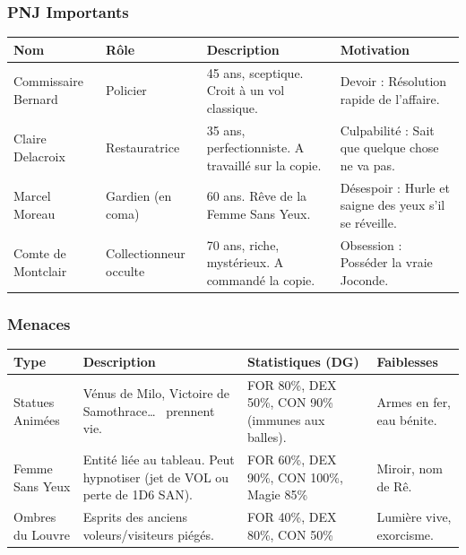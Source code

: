 \documentclass[10pt,a5paper,twoside]{book}
\begin{document}
\newpage

\subsubsection*{PNJ Importants}
\begin{center}
	\begin{tabular}{|P{2cm}|P{3cm}|P{3.5cm}|P{2.5cm}|}
	\hline
	\textbf{Nom} 		& \textbf{Rôle} 			& \textbf{Description}									& \textbf{Motivation} \\ \hline
	Commissaire Bernard & Policier 					& 45 ans, sceptique. Croit à un vol classique. 			& Devoir : Résolution rapide de l'affaire. \\ \hline
	Claire Delacroix 	& Restauratrice 			& 35 ans, perfectionniste. A travaillé sur la copie. 	& Culpabilité : Sait que quelque chose ne va pas. \\ \hline
	Marcel Moreau 		& Gardien (en coma) 		& 60 ans. Rêve de la Femme Sans Yeux. 					& Désespoir : Hurle et saigne des yeux s'il se réveille. \\ \hline
	Comte de Montclair 	& Collectionneur occulte 	& 70 ans, riche, mystérieux. A commandé la copie. 		& Obsession : Posséder la vraie Joconde. \\ \hline
	\end{tabular}
\end{center}

\subsubsection*{Menaces}

\begin{center}
	\begin{tabular}{|P{2cm}|P{3cm}|P{3.5cm}|P{2.5cm}|}
	\hline
	\textbf{Type} 		& \textbf{Description} 									& \textbf{Statistiques (DG)} 							& \textbf{Faiblesses} \\ \hline
	Statues Animées 	& Vénus de Milo, Victoire de Samothrace\ldots~  prennent vie. 	& FOR 80\%, DEX 50\%, CON 90\% (immunes aux balles). 	& Armes en fer, eau bénite. \\ \hline
	Femme Sans Yeux 	& Entité liée au tableau. Peut hypnotiser (jet de VOL ou perte de 1D6 SAN). 	& FOR 60\%, DEX 90\%, CON 100\%, Magie 85\% 	& Miroir, nom de Rê. \\ \hline
	Ombres du Louvre 	& Esprits des anciens voleurs/visiteurs piégés. 		& FOR 40\%, DEX 80\%, CON 50\% 							& Lumière vive, exorcisme. \\ \hline
	\end{tabular}
\end{center}
\end{document}
